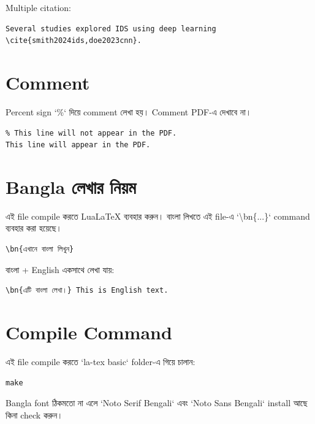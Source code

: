 \documentclass[12pt,a4paper]{article}
\newcommand{\bn}[1]{{\normalfont\banglafont #1}}
\begin{document}
\bn{Multiple citation:}

\begin{verbatim}
Several studies explored IDS using deep learning \cite{smith2024ids,doe2023cnn}.
\end{verbatim}

\section{\bn{Comment}}

\bn{Percent sign `\%` দিয়ে comment লেখা হয়। Comment PDF-এ দেখাবে না।}

\begin{verbatim}
% This line will not appear in the PDF.
This line will appear in the PDF.
\end{verbatim}

\section{\bn{Bangla লেখার নিয়ম}}

\bn{এই file compile করতে LuaLaTeX ব্যবহার করুন। বাংলা লিখতে এই file-এ
`\textbackslash bn\{...\}` command ব্যবহার করা হয়েছে।}

\begin{verbatim}
\bn{এখানে বাংলা লিখুন}
\end{verbatim}

\bn{বাংলা + English একসাথে লেখা যায়:}

\begin{verbatim}
\bn{এটি বাংলা লেখা।} This is English text.
\end{verbatim}

\section{\bn{Compile Command}}

\bn{এই file compile করতে `la-tex basic` folder-এ গিয়ে চালান:}

\begin{verbatim}
make
\end{verbatim}

\bn{Bangla font ঠিকমতো না এলে `Noto Serif Bengali` এবং `Noto Sans Bengali`
install আছে কিনা check করুন।}
\end{document}
